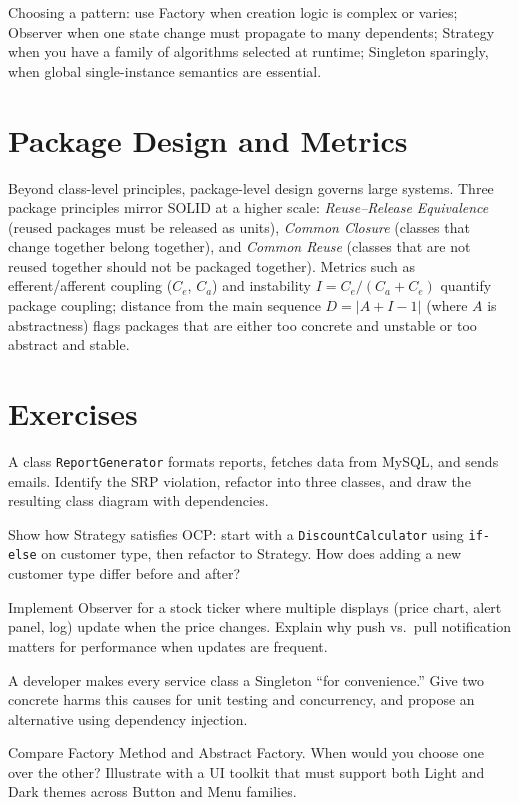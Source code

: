 Choosing a pattern: use Factory when creation logic is complex or varies; Observer when one state change must propagate to many dependents; Strategy when you have a family of algorithms selected at runtime; Singleton sparingly, when global single-instance semantics are essential.


\section{Package Design and Metrics}

Beyond class-level principles, package-level design governs large systems. Three package principles mirror SOLID at a higher scale: \emph{Reuse--Release Equivalence} (reused packages must be released as units), \emph{Common Closure} (classes that change together belong together), and \emph{Common Reuse} (classes that are not reused together should not be packaged together). Metrics such as efferent/afferent coupling ($C_e$, $C_a$) and instability $I = C_e/(C_a+C_e)$ quantify package coupling; distance from the main sequence $D = |A + I - 1|$ (where $A$ is abstractness) flags packages that are either too concrete and unstable or too abstract and stable.

\section{Exercises}

\begin{exercise}
A class \texttt{ReportGenerator} formats reports, fetches data from MySQL, and sends emails. Identify the SRP violation, refactor into three classes, and draw the resulting class diagram with dependencies.
\end{exercise}

\begin{exercise}
Show how Strategy satisfies OCP: start with a \texttt{DiscountCalculator} using \texttt{if-else} on customer type, then refactor to Strategy. How does adding a new customer type differ before and after?
\end{exercise}

\begin{exercise}
Implement Observer for a stock ticker where multiple displays (price chart, alert panel, log) update when the price changes. Explain why push vs.\ pull notification matters for performance when updates are frequent.
\end{exercise}

\begin{exercise}
A developer makes every service class a Singleton ``for convenience.'' Give two concrete harms this causes for unit testing and concurrency, and propose an alternative using dependency injection.
\end{exercise}

\begin{exercise}
Compare Factory Method and Abstract Factory. When would you choose one over the other? Illustrate with a UI toolkit that must support both Light and Dark themes across Button and Menu families.
\end{exercise}
